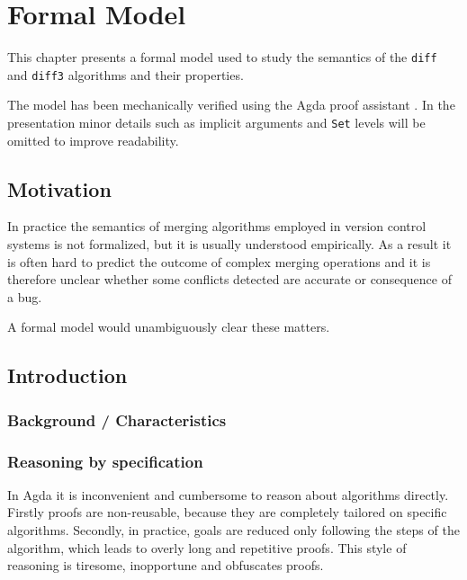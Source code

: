 \documentclass[../Thesis.tex]{subfiles}
\begin{document}
\chapter{Formal Model}
This chapter presents a formal model used to study the semantics of the \texttt{diff} and \texttt{diff3} algorithms and their properties.

The model has been mechanically verified using the Agda proof assistant
\cite{Bove09, NorellPhd, Norell08}.
In the presentation minor details such as implicit arguments and \texttt{Set} levels will be omitted to improve readability.

\section{Motivation}
In practice the semantics of merging algorithms employed in version control 
systems is not formalized, but it is usually understood empirically.
As a result it is often hard to predict the outcome of complex merging operations and it is therefore unclear whether some conflicts detected are accurate or consequence of a bug. 


A formal model would unambiguously clear these matters.

\section{Introduction}


	\subsection{Background / Characteristics}

	\subsection{Reasoning by specification}
	In Agda it is inconvenient and cumbersome to reason about algorithms directly.
	Firstly proofs are non-reusable, because they are completely tailored 
	on specific algorithms.
	Secondly, in practice,  goals are reduced only following the steps
	of the algorithm,	which leads to overly long and repetitive proofs. 
	This style of reasoning is tiresome, inopportune and obfuscates proofs.
\end{document}
